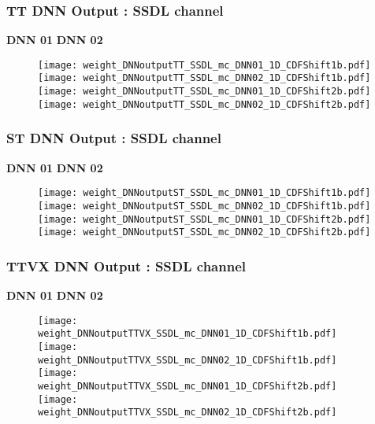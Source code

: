 \documentclass[9pt]{beamer}
\begin{document}
\begin{frame}
	\frametitle{TT DNN Output : SSDL channel}
	\hspace{2.0cm} \textbf{DNN 01} \hspace{4cm} \textbf{DNN 02} 
	\begin{figure}
		\texttt{[image: weight\_DNNoutputTT\_SSDL\_mc\_DNN01\_1D\_CDFShift1b.pdf]}
		\texttt{[image: weight\_DNNoutputTT\_SSDL\_mc\_DNN02\_1D\_CDFShift1b.pdf]}\\
		\texttt{[image: weight\_DNNoutputTT\_SSDL\_mc\_DNN01\_1D\_CDFShift2b.pdf]}
		\texttt{[image: weight\_DNNoutputTT\_SSDL\_mc\_DNN02\_1D\_CDFShift2b.pdf]}
	\end{figure}
\end{frame}
\begin{frame}
	\frametitle{ST DNN Output : SSDL channel}
	\hspace{2.0cm} \textbf{DNN 01} \hspace{4cm} \textbf{DNN 02} 
	\begin{figure}
		\texttt{[image: weight\_DNNoutputST\_SSDL\_mc\_DNN01\_1D\_CDFShift1b.pdf]}
		\texttt{[image: weight\_DNNoutputST\_SSDL\_mc\_DNN02\_1D\_CDFShift1b.pdf]}\\
		\texttt{[image: weight\_DNNoutputST\_SSDL\_mc\_DNN01\_1D\_CDFShift2b.pdf]}
		\texttt{[image: weight\_DNNoutputST\_SSDL\_mc\_DNN02\_1D\_CDFShift2b.pdf]}
	\end{figure}
\end{frame}
\begin{frame}
	\frametitle{TTVX DNN Output : SSDL channel}
	\hspace{2.0cm} \textbf{DNN 01} \hspace{4cm} \textbf{DNN 02} 
	\begin{figure}
		\texttt{[image: weight\_DNNoutputTTVX\_SSDL\_mc\_DNN01\_1D\_CDFShift1b.pdf]}
		\texttt{[image: weight\_DNNoutputTTVX\_SSDL\_mc\_DNN02\_1D\_CDFShift1b.pdf]}\\
		\texttt{[image: weight\_DNNoutputTTVX\_SSDL\_mc\_DNN01\_1D\_CDFShift2b.pdf]}
		\texttt{[image: weight\_DNNoutputTTVX\_SSDL\_mc\_DNN02\_1D\_CDFShift2b.pdf]}
	\end{figure}
\end{frame}
\end{document}
